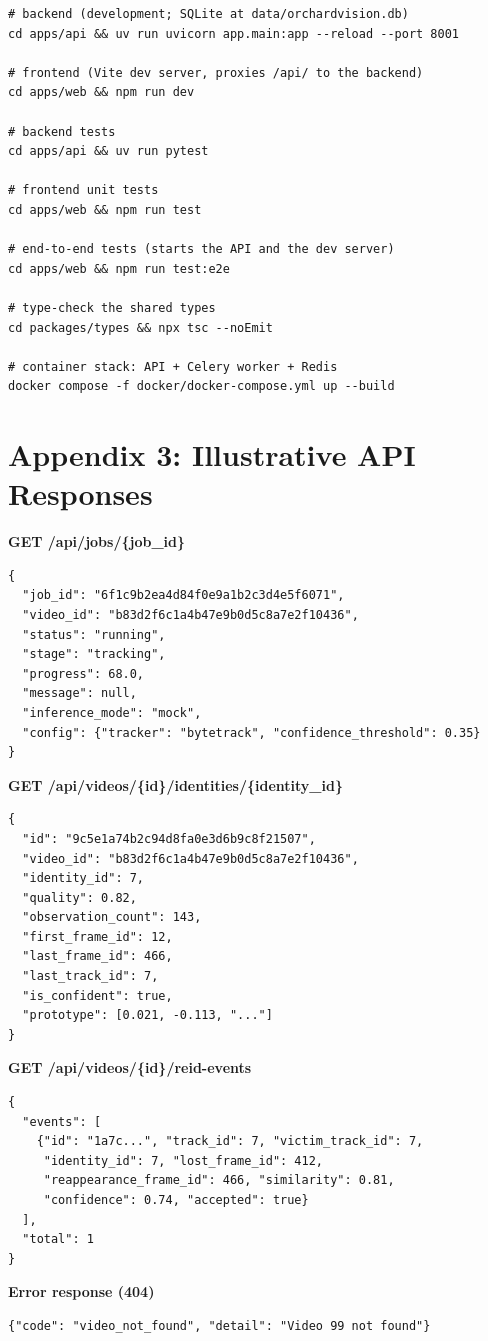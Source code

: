 \begin{lstlisting}[style=plain]
# backend (development; SQLite at data/orchardvision.db)
cd apps/api && uv run uvicorn app.main:app --reload --port 8001

# frontend (Vite dev server, proxies /api/ to the backend)
cd apps/web && npm run dev

# backend tests
cd apps/api && uv run pytest

# frontend unit tests
cd apps/web && npm run test

# end-to-end tests (starts the API and the dev server)
cd apps/web && npm run test:e2e

# type-check the shared types
cd packages/types && npx tsc --noEmit

# container stack: API + Celery worker + Redis
docker compose -f docker/docker-compose.yml up --build
\end{lstlisting}


\chapter*{Appendix 3: Illustrative API Responses}


\textbf{GET /api/jobs/\{job\_id\}}
\begin{lstlisting}[style=added]
{
  "job_id": "6f1c9b2ea4d84f0e9a1b2c3d4e5f6071",
  "video_id": "b83d2f6c1a4b47e9b0d5c8a7e2f10436",
  "status": "running",
  "stage": "tracking",
  "progress": 68.0,
  "message": null,
  "inference_mode": "mock",
  "config": {"tracker": "bytetrack", "confidence_threshold": 0.35}
}
\end{lstlisting}

\textbf{GET /api/videos/\{id\}/identities/\{identity\_id\}}
\begin{lstlisting}[style=added]
{
  "id": "9c5e1a74b2c94d8fa0e3d6b9c8f21507",
  "video_id": "b83d2f6c1a4b47e9b0d5c8a7e2f10436",
  "identity_id": 7,
  "quality": 0.82,
  "observation_count": 143,
  "first_frame_id": 12,
  "last_frame_id": 466,
  "last_track_id": 7,
  "is_confident": true,
  "prototype": [0.021, -0.113, "..."]
}
\end{lstlisting}

\textbf{GET /api/videos/\{id\}/reid-events}
\begin{lstlisting}[style=added]
{
  "events": [
    {"id": "1a7c...", "track_id": 7, "victim_track_id": 7,
     "identity_id": 7, "lost_frame_id": 412,
     "reappearance_frame_id": 466, "similarity": 0.81,
     "confidence": 0.74, "accepted": true}
  ],
  "total": 1
}
\end{lstlisting}

\textbf{Error response (404)}
\begin{lstlisting}[style=added]
{"code": "video_not_found", "detail": "Video 99 not found"}
\end{lstlisting}
